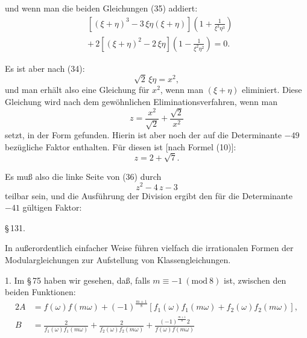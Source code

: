 und wenn man die beiden Gleichungen (35) addiert:
\[
\begin{aligned}
&[(\xi+\eta)^3-3\,\xi\eta(\xi+\eta)]\left(1+\frac{1}{\xi^3\eta^3}\right)\\
&+\,2[(\xi+\eta)^2-2\,\xi\eta]\left(1-\frac{1}{\xi^2\eta^2}\right)=0.
\end{aligned}
\]

Es ist aber nach (34):
\[
\sqrt2\,\xi\eta=x^2,
\]
und man erhält also eine Gleichung für $x^2$, wenn man $(\xi+\eta)$
eliminiert. Diese Gleichung wird nach dem gewöhnlichen Eliminationsverfahren, wenn man
\[
z=\frac{x^2}{\sqrt2}+\frac{\sqrt2}{x^2}
\]
setzt, in der Form
gefunden. Hierin ist aber noch der auf die Determinante $-49$ bezügliche
Faktor enthalten. Für diesen ist [nach Formel (10)]:
\[
z=2+\sqrt7.
\]

Es muß also die linke Seite von (36) durch
\[
z^2-4\,z-3
\]
teilbar sein, und die Ausführung der Division ergibt den für die
Determinante $-41$ gültigen Faktor:

\begin{center}
\S\,131. 
\end{center}

In außerordentlich einfacher Weise führen vielfach die irrationalen
Formen der Modulargleichungen zur Aufstellung von Klassengleichungen.

1. Im \S\,75 haben wir gesehen, daß, falls $m\equiv -1\ (\mathrm{mod}\ 8)$
ist, zwischen den beiden Funktionen:
\[
\begin{aligned}
2A&=f(\omega)f(m\omega)+(-1)^{\frac{m+1}{8}}[f_1(\omega)f_1(m\omega)+f_2(\omega)f_2(m\omega)],\\
B&=\frac{2}{f_1(\omega)f_1(m\omega)}+\frac{2}{f_2(\omega)f_2(m\omega)}+\frac{(-1)^{\frac{m+1}{8}}2}{f(\omega)f(m\omega)}
\end{aligned}
\]
